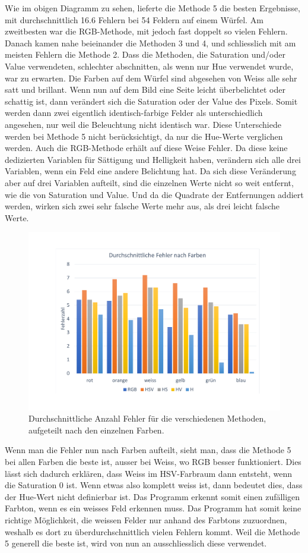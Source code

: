 \documentclass[a4paper, 12pt]{article}
\begin{document}
Wie im obigen Diagramm zu sehen, lieferte die Methode 5 die besten Ergebnisse, mit durchschnittlich 16.6 Fehlern bei 54 Feldern auf einem Würfel. Am zweitbesten war die RGB-Methode, mit jedoch fast doppelt so vielen Fehlern. Danach kamen nahe beieinander die Methoden 3 und 4, und schliesslich mit am meisten Fehlern die Methode 2. Dass die Methoden, die Saturation und/oder Value verwendeten, schlechter abschnitten, als wenn nur Hue verwendet wurde, war zu erwarten. Die Farben auf dem Würfel sind abgesehen von Weiss alle sehr satt und brillant. Wenn nun auf dem Bild eine Seite leicht überbelichtet oder schattig ist, dann verändert sich die Saturation oder der Value des Pixels. Somit werden dann zwei eigentlich identisch-farbige Felder als unterschiedlich angesehen, nur weil die Beleuchtung nicht identisch war. Diese Unterschiede werden bei Methode 5 nicht berücksichtigt, da nur die Hue-Werte verglichen werden. Auch die RGB-Methode erhält auf diese Weise Fehler. Da diese keine dedizierten Variablen für Sättigung und Helligkeit haben, verändern sich alle drei Variablen, wenn ein Feld eine andere Belichtung hat. Da sich diese Veränderung aber auf drei Variablen aufteilt, sind die einzelnen Werte nicht so weit entfernt, wie die von Saturation und Value. Und da die Quadrate der Entfernungen addiert werden, wirken sich zwei sehr falsche Werte mehr aus, als drei leicht falsche Werte. 
\begin{figure}[H]
\includegraphics[scale=0.4]{durchschnittliche_Fehler_nach_Farben}
\caption{Durchschnittliche Anzahl Fehler für die verschiedenen Methoden, aufgeteilt nach den einzelnen Farben.}
\end{figure}
\noindent
Wenn man die Fehler nun nach Farben aufteilt, sieht man, dass die Methode 5 bei allen Farben die beste ist, ausser bei Weiss, wo RGB besser funktioniert. Dies lässt sich dadurch erklären, dass Weiss im HSV-Farbraum dann entsteht, wenn die Saturation 0 ist. Wenn etwas also komplett weiss ist, dann bedeutet dies, dass der Hue-Wert nicht definierbar ist. Das Programm erkennt somit einen zufälligen Farbton, wenn es ein weisses Feld erkennen muss. Das Programm hat somit keine richtige Möglichkeit, die weissen Felder nur anhand des Farbtons zuzuordnen, weshalb es dort zu überdurchschnittlich vielen Fehlern kommt.
\newline
Weil die Methode 5 generell die beste ist, wird von nun an ausschliesslich diese verwendet. 
\end{document}
